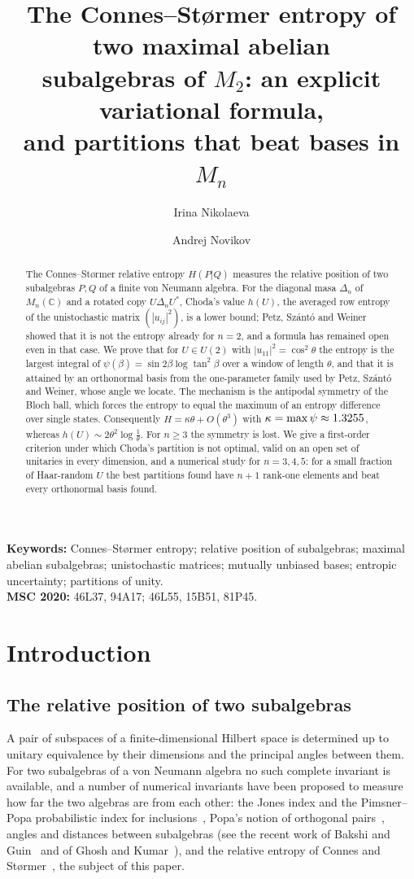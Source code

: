 \documentclass[11pt]{article}
\title{The Connes--St{\o}rmer entropy of two maximal abelian\\ subalgebras of $M_2$: an explicit variational formula,\\
and partitions that beat bases in $M_n$}
\author{Irina Nikolaeva \and Andrej Novikov}
\date{}
\newcommand{\C}{\mathbb{C}}
\theoremstyle{plain}
\theoremstyle{definition}
\theoremstyle{remark}
\begin{document}
\maketitle

\begin{abstract}
The Connes--St{\o}rmer relative entropy $H(P|Q)$ measures the relative position of two subalgebras $P,Q$ of a finite
von Neumann algebra. For the diagonal masa $\Delta_n$ of $M_n(\C)$ and a rotated copy $U\Delta_nU^*$, Choda's value
$h(U)$, the averaged row entropy of the unistochastic matrix $(|u_{ij}|^2)$, is a lower bound; Petz, Sz\'ant\'o and
Weiner showed that it is not the entropy already for $n=2$, and a formula has remained open even in that case. We prove
that for $U\in U(2)$ with $|u_{11}|^2=\cos^2\theta$ the entropy is the largest integral of
$\psi(\beta)=\sin2\beta\log\tan^2\beta$ over a window of length $\theta$, and that it is attained by an orthonormal basis
from the one-parameter family used by Petz, Sz\'ant\'o and Weiner, whose angle we locate. The mechanism is the antipodal
symmetry of the Bloch ball, which forces the entropy to equal the maximum of an entropy difference over single states.
Consequently $H=\kappa\theta+O(\theta^3)$ with $\kappa=\max\psi\approx1.3255$, whereas $h(U)\sim2\theta^2\log\frac1\theta$.
For $n\ge3$ the symmetry is lost. We give a first-order criterion under which Choda's partition is not optimal, valid on
an open set of unitaries in every dimension, and a numerical study for $n=3,4,5$: for a small fraction of Haar-random
$U$ the best partitions found have $n+1$ rank-one elements and beat every orthonormal basis found.
\end{abstract}

\noindent\textbf{Keywords:} Connes--St{\o}rmer entropy; relative position of subalgebras; maximal abelian subalgebras;
unistochastic matrices; mutually unbiased bases; entropic uncertainty; partitions of unity.\\
\textbf{MSC 2020:} 46L37, 94A17; 46L55, 15B51, 81P45.

\section{Introduction}\label{sec:intro}

\subsection{The relative position of two subalgebras}

A pair of subspaces of a finite-dimensional Hilbert space is determined up to unitary equivalence by their dimensions and
the principal angles between them. For two subalgebras of a von Neumann algebra no such complete invariant is available, and a number of numerical invariants have
been proposed to measure how far the two algebras are from each other: the Jones index and the Pimsner--Popa
probabilistic index for inclusions~\cite{jones1983,pimsner1986}, Popa's notion of orthogonal pairs~\cite{popa1983},
angles and distances between subalgebras (see the recent work of Bakshi and Guin~\cite{bakshi} and of Ghosh and
Kumar~\cite{ghosh2026}), and the relative entropy of Connes and St{\o}rmer~\cite{connes1975}, the subject of this paper.
\end{document}
